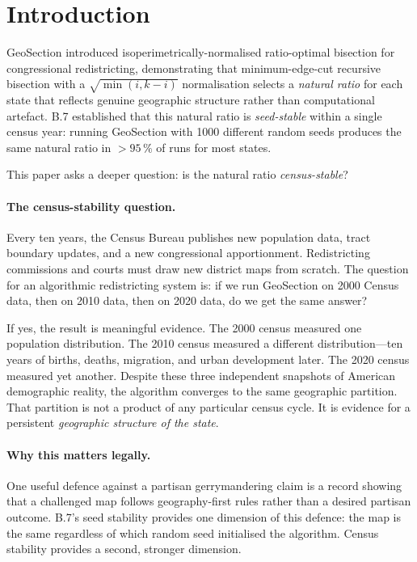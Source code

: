 \section{Introduction}
\label{sec:intro}

GeoSection \citep{b8paper} introduced isoperimetrically-normalised ratio-optimal
bisection for congressional redistricting, demonstrating that minimum-edge-cut
recursive bisection with a $\sqrt{\min(i,k-i)}$ normalisation selects a
\emph{natural ratio} for each state that reflects genuine geographic structure
rather than computational artefact.
B.7 \citep{b7paper} established that this natural ratio is \emph{seed-stable}
within a single census year: running GeoSection with 1000 different random seeds
produces the same natural ratio in $>95\,\%$ of runs for most states.

This paper asks a deeper question: is the natural ratio \emph{census-stable}?

\paragraph{The census-stability question.}
Every ten years, the Census Bureau publishes new population data, tract boundary
updates, and a new congressional apportionment.
Redistricting commissions and courts must draw new district maps from scratch.
The question for an algorithmic redistricting system is: if we run GeoSection on
2000 Census data, then on 2010 data, then on 2020 data, do we get the same
answer?

If yes, the result is meaningful evidence.
The 2000 census measured one population distribution.
The 2010 census measured a different distribution---ten years of births, deaths,
migration, and urban development later.
The 2020 census measured yet another.
Despite these three independent snapshots of American demographic reality, the
algorithm converges to the same geographic partition.
That partition is not a product of any particular census cycle.
It is evidence for a persistent \emph{geographic structure of the state}.

\paragraph{Why this matters legally.}
One useful defence against a partisan gerrymandering claim is a record showing
that a challenged map follows geography-first rules rather than a desired
partisan outcome.
B.7's seed stability provides one dimension of this defence: the map is the
same regardless of which random seed initialised the algorithm.
Census stability provides a second, stronger dimension.

